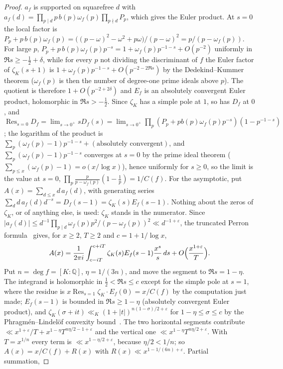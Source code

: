 \documentclass[11pt,a4paper]{article}
\theoremstyle{remark}\newtheorem{remark}[theorem]{Remark}
\newcommand{\Q}{\mathbb{Q}}
\begin{document}
\begin{proof}
$a_f$ is supported on squarefree $d$ with $a_f(d)=\prod_{p\mid d}p\,b(p)\omega_f(p)\prod_{p\nmid d}P_p$,
which gives the Euler product. At $s=0$ the local factor is
$P_p+p\,b(p)\omega_f(p)=\bigl((p-\omega)^2-\omega^2+p\omega\bigr)/(p-\omega)^2=p/(p-\omega_f(p))$. For
large $p$, $P_p+p\,b(p)\omega_f(p)p^{-s}=1+\omega_f(p)p^{-1-s}+O(p^{-2})$ uniformly in $\Re s\ge-\tfrac12+\delta$,
while for every $p$ not dividing the discriminant of $f$ the Euler factor of $\zeta_K(s+1)$ is
$1+\omega_f(p)p^{-1-s}+O(p^{-2-2\Re s})$ by the Dedekind--Kummer theorem ($\omega_f(p)$ is then the
number of degree-one prime ideals above $p$).
The quotient is therefore $1+O(p^{-2+2\delta})$ and $E_f$ is an absolutely convergent Euler product, holomorphic
in $\Re s>-\tfrac12$. Since $\zeta_K$ has a simple pole at $1$, so has $D_f$ at $0$, and
$\operatorname*{Res}_{s=0}D_f=\lim_{s\to0^+}sD_f(s)=\lim_{s\to0^+}\prod_p(P_p+pb(p)\omega_f(p)p^{-s})(1-p^{-1-s})$;
the logarithm of the product is $\sum_p(\omega_f(p)-1)p^{-1-s}+(\text{absolutely convergent})$, and
$\sum_p(\omega_f(p)-1)p^{-1-s}$ converges at $s=0$ by the prime ideal theorem ($\sum_{p\le x}(\omega_f(p)-1)=o(x/\log x)$),
hence uniformly for $s\ge0$, so the limit is the value at $s=0$, $\prod_p\frac{p}{p-\omega_f(p)}(1-\frac1p)=1/C(f)$.
For the asymptotic, put $A(x)=\sum_{d\le x}d\,a_f(d)$, with generating series
$\sum_dd\,a_f(d)d^{-s}=D_f(s-1)=\zeta_K(s)E_f(s-1)$. Nothing about the zeros of $\zeta_K$, or of anything else, is
used: $\zeta_K$ stands in the numerator. Since $|a_f(d)|\le d^{-1}\prod_{p\mid d}\omega_f(p)p^2/(p-\omega_f(p))^2\ll
d^{-1+\varepsilon}$, the truncated Perron formula~\cite[II.2]{Tenenbaum2015} gives, for $x\ge2$, $T\ge2$
and $c=1+1/\log x$,
\[
A(x)=\frac1{2\pi i}\int_{c-iT}^{c+iT}\zeta_K(s)E_f(s-1)\frac{x^s}s\,ds+O\Bigl(\frac{x^{1+\varepsilon}}T\Bigr).
\]
Put $n=\deg f=[K:\Q]$, $\eta=1/(3n)$, and move the segment to $\Re s=1-\eta$. The integrand is holomorphic in $\tfrac12<\Re s\le c$
except for the simple pole at $s=1$, where the residue is $x\operatorname*{Res}_{s=1}\zeta_K\cdot E_f(0)=x/C(f)$ by
the computation just made; $E_f(s-1)$ is bounded in $\Re s\ge1-\eta$ (absolutely convergent Euler product), and
$\zeta_K(\sigma+it)\ll_K(1+|t|)^{n(1-\sigma)/2+\varepsilon}$ for $1-\eta\le\sigma\le c$ by the
Phragm\'en--Lindel\"of convexity bound~\cite{Rademacher1959}. The two horizontal segments contribute
$\ll x^{1+\varepsilon}/T+x^{1-\eta}T^{n\eta/2-1+\varepsilon}$ and the vertical one $\ll x^{1-\eta}T^{n\eta/2+\varepsilon}$.
With $T=x^{1/n}$ every term is $\ll x^{1-\eta/2+\varepsilon}$, because $\eta/2<1/n$; so $A(x)=x/C(f)+R(x)$ with $R(x)\ll x^{1-1/(6n)+\varepsilon}$. Partial summation,

\end{proof}
\end{document}
